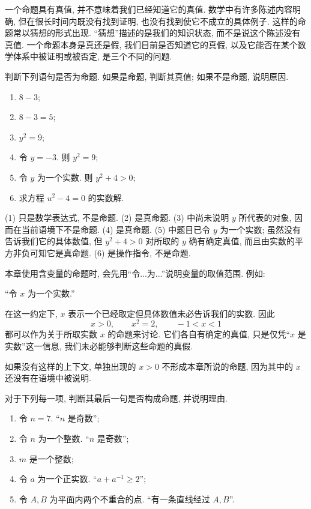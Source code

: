 \documentclass[usesamecnt, thmcnt=section, lang=cn, newtx, 10pt, scheme=chinese]{elegantbook}
\begin{document}
\begin{knowledge}
一个命题具有真值, 并不意味着我们已经知道它的真值. 数学中有许多陈述内容明确, 但在很长时间内既没有找到证明, 也没有找到使它不成立的具体例子. 这样的命题常以猜想的形式出现. ``猜想''描述的是我们的知识状态, 而不是说这个陈述没有真值. 一个命题本身是真还是假, 我们目前是否知道它的真假, 以及它能否在某个数学体系中被证明或被否定, 是三个不同的问题.
\end{knowledge}

\begin{concept}
\label{con:logic-01}
判断下列语句是否为命题. 如果是命题, 判断其真值; 如果不是命题, 说明原因.
\begin{enumerate}[label=\rm(\arabic*)]
  \item $8-3$;
  \item $8-3=5$;
  \item $y^2=9$;
  \item 令 $y=-3$. 则 $y^2=9$;
  \item 令 $y$ 为一个实数. 则 $y^2+4>0$;
  \item 求方程 $u^2-4=0$ 的实数解.
\end{enumerate}
\end{concept}

\begin{solution}
(1) 只是数学表达式, 不是命题. (2) 是真命题. (3) 中尚未说明 $y$ 所代表的对象, 因而在当前语境下不是命题. (4) 是真命题. (5) 中题目已令 $y$ 为一个实数; 虽然没有告诉我们它的具体数值, 但 $y^2+4>0$ 对所取的 $y$ 确有确定真值, 而且由实数的平方非负可知它是真命题. (6) 是操作指令, 不是命题.
\end{solution}

\begin{notation}[含变量命题的约定]
本章使用含变量的命题时, 会先用``令...为...''说明变量的取值范围. 例如:

``令 $x$ 为一个实数.''

在这一约定下, $x$ 表示一个已经取定但具体数值未必告诉我们的实数. 因此
\[
 x>0,\qquad x^2=2,\qquad -1<x<1
\]
都可以作为关于所取实数 $x$ 的命题来讨论. 它们各自有确定的真值, 只是仅凭``$x$ 是实数''这一信息, 我们未必能够判断这些命题的真假.

如果没有这样的上下文, 单独出现的 $x>0$ 不形成本章所说的命题, 因为其中的 $x$ 还没有在语境中被说明.
\end{notation}

\begin{exercise}
\label{ex:logic-01}
对于下列每一项, 判断其最后一句是否构成命题, 并说明理由.
\begin{enumerate}[label=\rm(\arabic*)]
  \item 令 $n=7$. ``$n$ 是奇数'';
  \item 令 $n$ 为一个整数. ``$n$ 是奇数'';
  \item $m$ 是一个整数;
  \item 令 $a$ 为一个正实数. ``$a+a^{-1}\geq 2$'';
  \item 令 $A,B$ 为平面内两个不重合的点. ``有一条直线经过 $A,B$''.
\end{enumerate}
\end{exercise}
\end{document}
